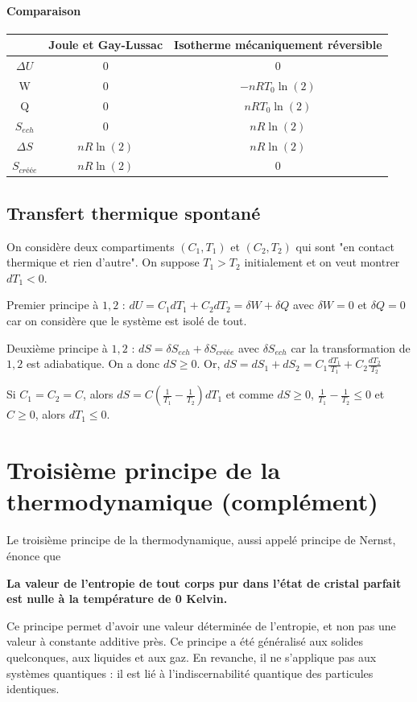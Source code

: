 \documentclass[french]{book}
\theoremstyle{plain}
\theoremstyle{definition}
\theoremstyle{remark}
\begin{document}
\paragraph{Comparaison}
\begin{center}
	\begin{tabular}{|c|c|c|}
		\hline
		& Joule et Gay-Lussac & Isotherme mécaniquement réversible \tabularnewline
		\hline 
		$\Delta U$ & 0 & 0 \\
		\hline
		W&0&$-nRT_0\ln(2)$\\
		\hline
		Q&0&$nRT_0\ln(2)$\\
		\hline
		$S_{ech}$&0&$nR\ln(2)$\\
		\hline
		$\Delta S$&$nR\ln(2)$&$nR\ln(2)$\\
		\hline
		$S_{créée}$&$nR\ln(2)$&0\\
		\hline		
	\end{tabular}
\end{center}
\subsection{Transfert thermique spontané}
On considère deux compartiments $(C_1,T_1)$ et $(C_2,T_2)$ qui sont "en contact thermique et rien d'autre". On suppose $T_1>T_2$ initialement et on veut montrer $dT_1<0$. \\ \par Premier principe à ${1,2}$ : $dU=C_1dT_1+C_2dT_2=\delta W+\delta Q$ avec $\delta W=0$ et $\delta Q=0$ car on considère que le système est isolé de tout. \\ \par Deuxième principe à ${1,2}$ : $dS=\delta S_{ech}+\delta S_{créée}$ avec $\delta S_{ech}$ car la transformation de ${1,2}$ est adiabatique. On a donc $dS\geqslant 0$. Or, $dS=dS_1+dS_2=C_1\displaystyle\frac{dT_1}{T_1}+C_2\frac{dT_2}{T_2}$ \\ \par Si $C_1=C_2=C$, alors $dS=C\left(\displaystyle\frac{1}{T_1}-\frac{1}{T_2}\right)dT_1$ et comme $dS\geqslant0$, $\displaystyle \frac{1}{T_1}-\frac{1}{T_2}\leqslant0$ et $C\geqslant0$, alors $dT_1\leqslant0$.
\section{Troisième principe de la thermodynamique (complément)}
Le troisième principe de la thermodynamique, aussi appelé principe de Nernst, énonce que 
\begin{center}
	\textbf{La valeur de l'entropie de tout corps pur dans l'état de cristal parfait est nulle à la température de 0 Kelvin.}
\end{center}
Ce principe permet d'avoir une valeur déterminée de l'entropie, et non pas une valeur à constante additive près. Ce principe a été généralisé aux solides quelconques, aux liquides et aux gaz. En revanche, il ne s'applique pas aux systèmes quantiques : il est lié à l'indiscernabilité quantique des particules identiques.
\end{document}
